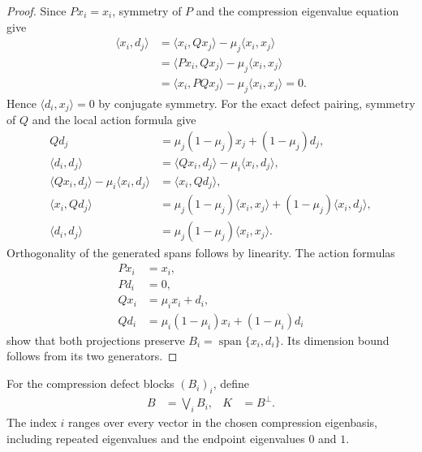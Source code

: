 \begin{proof}\leanok
    Since $Px_i=x_i$, symmetry of $P$ and the compression eigenvalue equation give
    \begin{align}
        \langle x_i,d_j\rangle
         & =\langle x_i,Qx_j\rangle-\mu_j\langle x_i,x_j\rangle     \\
         & =\langle Px_i,Qx_j\rangle-\mu_j\langle x_i,x_j\rangle    \\
         & =\langle x_i,PQx_j\rangle-\mu_j\langle x_i,x_j\rangle=0.
    \end{align}
    Hence $\langle d_i,x_j\rangle=0$ by conjugate symmetry. For the exact defect
    pairing, symmetry of $Q$ and the local action formula give
    \begin{align}
        Qd_j & =\mu_j(1-\mu_j)x_j+(1-\mu_j)d_j,                      \\
        \langle d_i,d_j\rangle
             & =\langle Qx_i,d_j\rangle-\mu_i\langle x_i,d_j\rangle, \\
        \langle Qx_i,d_j\rangle-\mu_i\langle x_i,d_j\rangle
             & =\langle x_i,Qd_j\rangle,                             \\
        \langle x_i,Qd_j\rangle
             & =\mu_j(1-\mu_j)\langle x_i,x_j\rangle
        +(1-\mu_j)\langle x_i,d_j\rangle,                            \\
        \langle d_i,d_j\rangle
             & =\mu_j(1-\mu_j)\langle x_i,x_j\rangle.
    \end{align}
    Orthogonality of the generated spans follows by linearity. The action formulas
    \begin{align}
        Px_i & =x_i,                           \\
        Pd_i & =0,                             \\
        Qx_i & =\mu_i x_i+d_i,                 \\
        Qd_i & =\mu_i(1-\mu_i)x_i+(1-\mu_i)d_i
    \end{align}
    show that both projections preserve
    $B_i=\operatorname{span}\{x_i,d_i\}$. Its dimension bound follows from
    its two generators.
\end{proof}
\begin{definition}
    \label{def:mpu_two_projection_angle_defect_sum}
    \leanok
    For the compression defect blocks $(B_i)_i$, define
    \begin{align}
        B & =\bigvee_i B_i, & K & =B^\perp.
    \end{align}
    The index $i$ ranges over every vector in the chosen compression eigenbasis,
    including repeated eigenvalues and the endpoint eigenvalues $0$ and $1$.
\end{definition}

